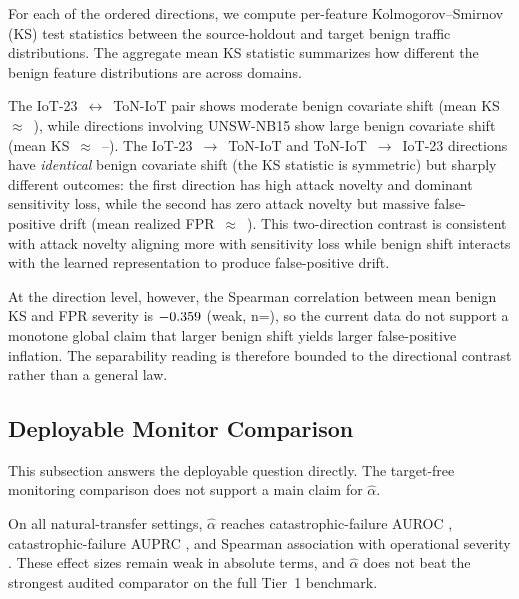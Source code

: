 \documentclass[preprint,12pt]{elsarticle}
\begin{document}
For each of the \DirectionCount{} ordered directions, we compute per-feature Kolmogorov--Smirnov (KS) test statistics between the source-holdout and target benign traffic distributions. The aggregate mean KS statistic summarizes how different the benign feature distributions are across domains.

The IoT-23~$\leftrightarrow$~ToN-IoT pair shows moderate benign covariate shift (mean KS~$\approx$~\IotPairMeanKs{}), while directions involving UNSW-NB15 show large benign covariate shift (mean KS~$\approx$~\UnswDirectionMeanKsMin{}--\UnswDirectionMeanKsMax{}). The IoT-23~$\to$~ToN-IoT and ToN-IoT~$\to$~IoT-23 directions have \emph{identical} benign covariate shift (the KS statistic is symmetric) but sharply different outcomes: the first direction has high attack novelty and dominant sensitivity loss, while the second has zero attack novelty but massive false-positive drift (mean realized FPR~$\approx$~\TonToIotMeanRealizedFpr{}). This two-direction contrast is consistent with attack novelty aligning more with sensitivity loss while benign shift interacts with the learned representation to produce false-positive drift.

At the direction level, however, the Spearman correlation between mean benign KS and FPR severity is $-0.359{}$ (weak, n=\DirectionCount{}), so the current data do not support a monotone global claim that larger benign shift yields larger false-positive inflation. The separability reading is therefore bounded to the directional contrast rather than a general law.

\FloatBarrier

\subsection{Deployable Monitor Comparison}

This subsection answers the deployable question directly. The target-free monitoring comparison does not support a main claim for $\hat{\alpha}$.

On all natural-transfer settings, $\hat{\alpha}$ reaches catastrophic-failure AUROC \AlphaHatAllNaturalCatastrophicAuroc{}, catastrophic-failure AUPRC \AlphaHatAllNaturalCatastrophicAuprc{}, and Spearman association with operational severity \AlphaHatAllNaturalSeveritySpearman{}. These effect sizes remain weak in absolute terms, and $\hat{\alpha}$ does not beat the strongest audited comparator on the full Tier~1 benchmark.
\end{document}
